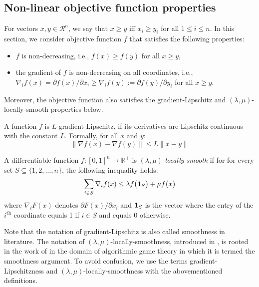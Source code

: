 \subsection{Non-linear objective function properties} \label{sec:f-properties}

For vectors $x, y \in \mathcal{R}^{n}$, we say that $x \geq y$ iff $x_{i} \geq y_{i}$ for all $1 \leq i \leq n$.
In this section, we consider objective function $f$ that satisfies the following properties:
\begin{itemize}
	\item $f$ is non-decreasing, i.e., $f(x) \geq f(y)$ for all $x \geq y$,
	\item the gradient of $f$ is non-decreasing on all coordinates, i.e., $\nabla_{i} f(x) = \partial f(x)/\partial x_{i} \geq \nabla_{i} f(y) := \partial f(y)/\partial y_{i}$ for all $x \geq y$.
\end{itemize}
%
Moreover, the objective function also satisfies the gradient-Lipschitz and $(\lambda,\mu)$-locally-smooth properties below.


\begin{definition}
    A function $f$ is $L$-gradient-Lipschitz, if its derivatives are Lipschitz-continuous with the constant $L$. Formally, for all $x$ and $y$:
    \[\|\nabla f(x) - \nabla f(y)\| \le L \|x - y\|\]
\end{definition}

\begin{definition}
    A differentiable function $f: [0,1]^{n} \rightarrow \mathbb{R}^{+}$ is $(\lambda,\mu)$-\emph{locally-smooth}
    if for  for every set $S \subseteq \{1, 2, \ldots, n\}$, the following inequality holds:
    \begin{equation*}	\label{eq:min-local-smooth}
    \sum_{i \in S} \nabla_{i} f(x) \leq \lambda f\bigl( \mathbf{1}_{S} \bigr) + \mu f\bigl( x \bigr)
    \end{equation*}
    where $\nabla_{i} F(x)$ denotes $\partial F(x)/\partial x_{i}$ and $\mathbf{1}_{S}$ is the vector where the entry of the $i^{\text{th}}$ coordinate equals 1 if $i \in S$
    and equals 0 otherwise.
\end{definition}

Note that the notation of gradient-Lipschitz is also called smoothness in literature. The notation of $(\lambda,\mu)$-locally-smoothness, introduced in \cite{Thang20:Online-Primal-Dual}, is rooted in the work of \cite{Roughgarden15:Intrinsic-Robustness}
in the domain of algorithmic game theory in which it is termed the smoothness argument.
To avoid confusion, we use the terms gradient-Lipschitzness and $(\lambda,\mu)$-locally-smoothness with the abovementioned definitions.

